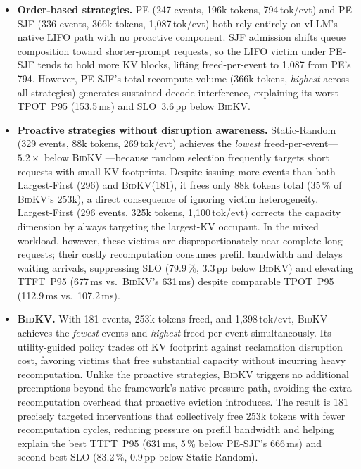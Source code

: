 \documentclass[conference]{IEEEtran}
\newcommand{\bidkv}{\textsc{BidKV}\xspace}
\begin{document}
\begin{itemize}
\item\textbf{Order-based strategies.}
PE (247 events, 196k tokens, 794\,tok/evt) and PE-SJF (336 events, 366k
tokens, 1{,}087\,tok/evt) both rely entirely on vLLM's native LIFO path with
no proactive component.  SJF admission shifts queue composition toward
shorter-prompt requests, so the LIFO victim under PE-SJF tends to hold more KV
blocks, lifting freed-per-event to 1{,}087 from PE's 794.  However, PE-SJF's
total recompute volume (366k tokens, \emph{highest} across all strategies)
generates sustained decode interference, explaining its worst TPOT~P95
(153.5\,ms) and SLO~3.6\,pp below \bidkv.

\item \textbf{Proactive strategies without disruption awareness.}
Static-Random (329 events, 88k tokens, 269\,tok/evt) achieves the
\emph{lowest} freed-per-event---$5.2{\times}$ below \bidkv
---because random selection frequently targets short requests with small KV
footprints.  Despite issuing more events than both Largest-First (296) and
\bidkv (181), it frees only 88k tokens total (35\,\% of \bidkv's 253k),
a direct consequence of ignoring victim heterogeneity.  Largest-First (296
events, 325k tokens, 1{,}100\,tok/evt) corrects the capacity dimension by
always targeting the largest-KV occupant.  In the mixed workload, however,
these victims are disproportionately near-complete long requests; their costly
recomputation consumes prefill bandwidth and delays waiting arrivals,
suppressing SLO (79.9\,\%, 3.3\,pp below \bidkv) and elevating TTFT~P95
(677\,ms vs.\ \bidkv's 631\,ms) despite comparable TPOT~P95
(112.9\,ms vs.\ 107.2\,ms).

\item \textbf{\bidkv.}
With 181 events, 253k tokens freed, and 1{,}398\,tok/evt, \bidkv achieves
the \emph{fewest} events and \emph{highest} freed-per-event simultaneously.
Its utility-guided policy trades off KV footprint against reclamation
disruption cost, favoring victims that free substantial capacity without
incurring heavy recomputation.  Unlike the proactive strategies, \bidkv
triggers no additional preemptions beyond the framework's native pressure
path, avoiding the extra recomputation overhead that proactive eviction
introduces.  The result is 181 precisely targeted interventions that
collectively free 253k tokens with fewer recomputation cycles, reducing
pressure on prefill bandwidth and helping explain the best TTFT~P95
(631\,ms, 5\,\% below PE-SJF's 666\,ms) and second-best SLO (83.2\,\%,
0.9\,pp below Static-Random).
\end{itemize}
\end{document}
